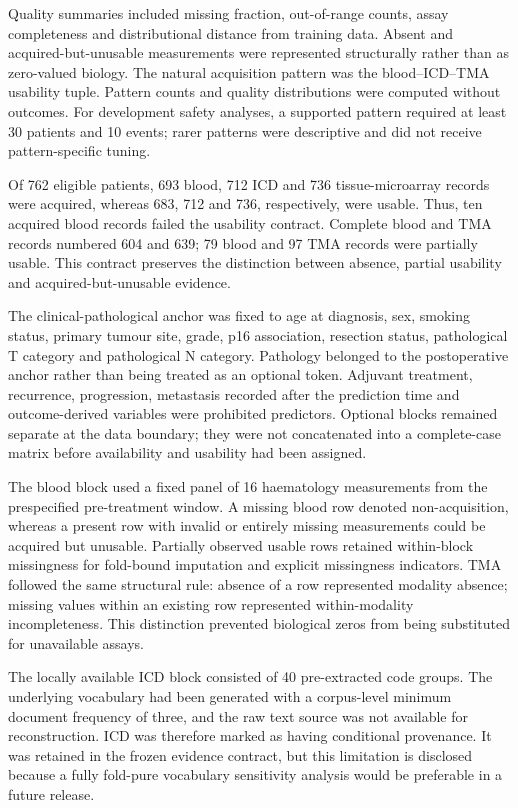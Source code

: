 \documentclass[pdflatex,sn-nature]{sn-jnl}
\begin{document}
Quality summaries included missing fraction, out-of-range counts, assay completeness and distributional distance from training data. Absent and acquired-but-unusable measurements were represented structurally rather than as zero-valued biology. The natural acquisition pattern was the blood--ICD--TMA usability tuple. Pattern counts and quality distributions were computed without outcomes. For development safety analyses, a supported pattern required at least 30 patients and 10 events; rarer patterns were descriptive and did not receive pattern-specific tuning.

Of 762 eligible patients, 693 blood, 712 ICD and 736 tissue-microarray records were acquired, whereas 683, 712 and 736, respectively, were usable. Thus, ten acquired blood records failed the usability contract. Complete blood and TMA records numbered 604 and 639; 79 blood and 97 TMA records were partially usable. This contract preserves the distinction between absence, partial usability and acquired-but-unusable evidence.

The clinical-pathological anchor was fixed to age at diagnosis, sex, smoking status, primary tumour site, grade, p16 association, resection status, pathological T category and pathological N category. Pathology belonged to the postoperative anchor rather than being treated as an optional token. Adjuvant treatment, recurrence, progression, metastasis recorded after the prediction time and outcome-derived variables were prohibited predictors. Optional blocks remained separate at the data boundary; they were not concatenated into a complete-case matrix before availability and usability had been assigned.

The blood block used a fixed panel of 16 haematology measurements from the prespecified pre-treatment window. A missing blood row denoted non-acquisition, whereas a present row with invalid or entirely missing measurements could be acquired but unusable. Partially observed usable rows retained within-block missingness for fold-bound imputation and explicit missingness indicators. TMA followed the same structural rule: absence of a row represented modality absence; missing values within an existing row represented within-modality incompleteness. This distinction prevented biological zeros from being substituted for unavailable assays.

The locally available ICD block consisted of 40 pre-extracted code groups. The underlying vocabulary had been generated with a corpus-level minimum document frequency of three, and the raw text source was not available for reconstruction. ICD was therefore marked as having conditional provenance. It was retained in the frozen evidence contract, but this limitation is disclosed because a fully fold-pure vocabulary sensitivity analysis would be preferable in a future release.
\end{document}

